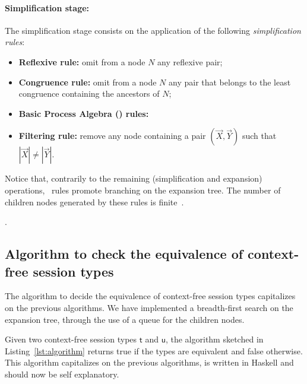 \paragraph{Simplification stage:} The simplification stage consists on the application of the following \emph{simplification rules}:
\begin{itemize}
	\item {\bf Reflexive rule:} omit from a node $N$ any reflexive pair;
	\item {\bf Congruence rule:}  omit from a node $N$ any pair that 
	      belongs to the least congruence containing the ancestors of $N$;
	\item {\bf Basic Process Algebra (\BPA) rules:} 
	\item {\bf Filtering rule:} remove any node containing a pair
	       $(\vec X, \vec Y)$ such that $|\vec X|\neq |\vec Y|$.
\end{itemize}

Notice that, contrarily to the remaining (simplification and expansion) operations, 
\BPA\ rules promote branching on the expansion tree. The number of children nodes generated by these rules is finite~\cite{DBLP:journals/iandc/ChristensenHS95}.

. 

\subsection{Algorithm to check the equivalence of context-free session types}

The algorithm to decide the equivalence of context-free session 
types capitalizes on the previous algorithms. We have implemented 
a breadth-first search on the expansion tree, through the use of a 
queue for the children nodes.

Given two context-free session types $\mathsf{t}$ and $\mathsf{u}$,
the algorithm sketched in Listing~\ref{lst:algorithm} returns \textsf{true}
if the types are equivalent and \textsf{false} otherwise. 
This algorithm capitalizes on the previous algorithms, is written in Haskell 
and should now be self explanatory.


